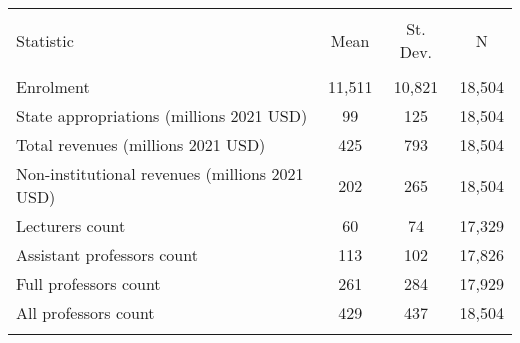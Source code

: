 
\begin{tabular}{@{\extracolsep{5pt}}lccc} 
\\[-1.8ex]\hline 
\hline \\[-1.8ex] 
Statistic & \multicolumn{1}{c}{Mean} & \multicolumn{1}{c}{St. Dev.} & \multicolumn{1}{c}{N} \\ 
\hline \\[-1.8ex] 
Enrolment & 11,511 & 10,821 & 18,504 \\ 
State appropriations (millions 2021 USD) & 99 & 125 & 18,504 \\ 
Total revenues (millions 2021 USD) & 425 & 793 & 18,504 \\ 
Non-institutional revenues (millions 2021 USD) & 202 & 265 & 18,504 \\ 
Lecturers count & 60 & 74 & 17,329 \\ 
Assistant professors count & 113 & 102 & 17,826 \\ 
Full professors count & 261 & 284 & 17,929 \\ 
All professors count & 429 & 437 & 18,504 \\ 
\hline \\[-1.8ex] 
\end{tabular} 
